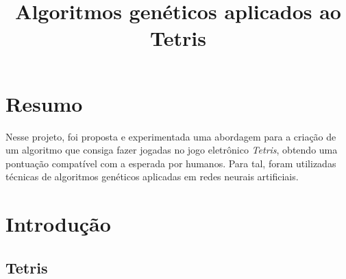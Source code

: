 \documentclass[conference]{IEEEtran}
\begin{document}
\title{Algoritmos genéticos aplicados ao Tetris}

\author{
\and
{}
\and
{}
\and
{}
}


\maketitle

\section{Resumo}
Nesse projeto, foi proposta e experimentada uma abordagem para a criação de um algoritmo que consiga fazer jogadas no jogo eletrônico \textit{Tetris}, obtendo uma pontuação compatível com a esperada por humanos. Para tal, foram utilizadas técnicas de algoritmos genéticos aplicadas em redes neurais artificiais.

\section{Introdução}

\subsection{Tetris}
\end{document}

